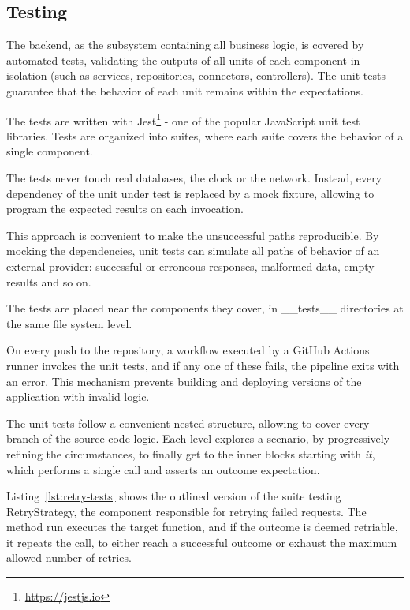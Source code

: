 \subsection{Testing} \label{sec:testing}

The backend, as the subsystem containing all business logic, is covered by automated tests, validating the outputs of all units of each component in isolation (such as services, repositories, connectors, controllers).
The unit tests guarantee that the behavior of each unit remains within the expectations.

The tests are written with \textsf{Jest}\footnote{\url{https://jestjs.io}} - one of the popular JavaScript unit test libraries.
Tests are organized into suites, where each suite covers the behavior of a single component.

The tests never touch real databases, the clock or the network.
Instead, every dependency of the unit under test is replaced by a mock fixture, allowing to program the expected results on each invocation.

This approach is convenient to make the unsuccessful paths reproducible.
By mocking the dependencies, unit tests can simulate all paths of behavior of an external provider: successful or erroneous responses, malformed data, empty results and so on.

The tests are placed near the components they cover, in \textsf{\_\_tests\_\_} directories at the same file system level.

On every push to the repository, a workflow executed by a \textsf{GitHub Actions} runner invokes the unit tests, and if any one of these fails, the pipeline exits with an error.
This mechanism prevents building and deploying versions of the application with invalid logic.

The unit tests follow a convenient nested structure, allowing to cover every branch of the source code logic.
Each level explores a scenario, by progressively refining the circumstances, to finally get to the inner blocks starting with \emph{it}, which performs a single call and asserts an outcome expectation.

Listing~\ref{lst:retry-tests} shows the outlined version of the suite testing \textsf{RetryStrategy}, the component responsible for retrying failed requests.
The method \textsf{run} executes the target function, and if the outcome is deemed retriable, it repeats the call, to either reach a successful outcome or exhaust the maximum allowed number of retries.


